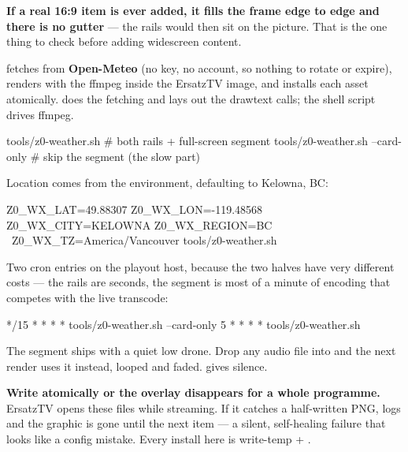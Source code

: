 \documentclass[fontpath=fonts/,logopath=logo/]{riposte-doc}
\begin{document}
\textbf{If a real 16:9 item is ever added, it fills the frame edge to edge and there is no gutter} — the rails would then sit on the picture. That is the one thing to check before adding widescreen content.



 fetches from \textbf{Open-Meteo} (no key, no account, so nothing to rotate or expire), renders with the ffmpeg inside the ErsatzTV image, and installs each asset atomically.  does the fetching and lays out the drawtext calls; the shell script drives ffmpeg.

\ripcodeopen
{}
\begin{ripcodeblock}
tools/z0-weather.sh              # both rails + full-screen segment
tools/z0-weather.sh --card-only  # skip the segment (the slow part)
\end{ripcodeblock}
\ripcodesizereset\ripcodeclose

Location comes from the environment, defaulting to Kelowna, BC:

\ripcodeopen
{}
\begin{ripcodeblock}
Z0_WX_LAT=49.88307 Z0_WX_LON=-119.48568 Z0_WX_CITY=KELOWNA Z0_WX_REGION=BC \
Z0_WX_TZ=America/Vancouver tools/z0-weather.sh
\end{ripcodeblock}
\ripcodesizereset\ripcodeclose

Two cron entries on the playout host, because the two halves have very different costs — the rails are seconds, the segment is most of a minute of encoding that competes with the live transcode:

\ripcodeopen
{}
\begin{ripcodeblock}
*/15 * * * *   tools/z0-weather.sh --card-only
5    * * * *   tools/z0-weather.sh
\end{ripcodeblock}
\ripcodesizereset\ripcodeclose



The segment ships with a quiet low drone. Drop any audio file into  and the next render uses it instead, looped and faded.  gives silence.



\textbf{Write atomically or the overlay disappears for a whole programme.} ErsatzTV opens these files while streaming. If it catches a half-written PNG,  logs  and the graphic is gone until the next item — a silent, self-healing failure that looks like a config mistake. Every install here is write-temp + .
\end{document}
